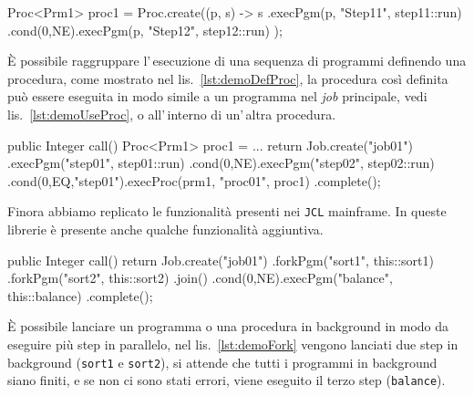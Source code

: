 \begin{elisting}[!htb]
\begin{javacode}
    Proc<Prm1> proc1 = Proc.create((p, s) -> s
        .execPgm(p, "Step11", step11::run)
        .cond(0,NE).execPgm(p, "Step12", step12::run)
    );
\end{javacode}
\caption{Esempio di definizione di una procedura con una classe parametro}
\label{lst:demoDefProc}
\end{elisting}
È possibile raggruppare l'\,esecuzione di una sequenza di programmi definendo
una procedura, come mostrato nel lis.~\ref{lst:demoDefProc}, la procedura così
definita può essere eseguita in modo simile a un programma nel \textit{job}
principale, vedi lis.~\ref{lst:demoUseProc}, o all'\,interno di un'\,altra
procedura.
\begin{elisting}[!htb]
\begin{javacode}
public Integer call() {
    Proc<Prm1> proc1 = ...
    return Job.create("job01")
        .execPgm("step01", step01::run)
        .cond(0,NE).execPgm("step02", step02::run)
        .cond(0,EQ,"step01").execProc(prm1, "proc01", proc1)
        .complete();
}
\end{javacode}
\caption{Esempio uso di una procedura nel job}
\label{lst:demoUseProc}
\end{elisting}

Finora abbiamo replicato le funzionalità presenti nei \texttt{JCL} mainframe.
In queste librerie è presente anche qualche funzionalità aggiuntiva.

\begin{elisting}[!htb]
\begin{javacode}
public Integer call() {
    return Job.create("job01")
        .forkPgm("sort1", this::sort1)
        .forkPgm("sort2", this::sort2)
        .join()
        .cond(0,NE).execPgm("balance", this::balance)
        .complete();
}
\end{javacode}
\caption{Esempio uso di una procedura nel job}
\label{lst:demoFork}
\end{elisting}
È possibile lanciare un programma o una procedura in background in modo da
eseguire più step in parallelo, nel lis.~\ref{lst:demoFork} vengono lanciati due
step in background (\texttt{sort1} e \texttt{sort2}), si attende che tutti i
programmi in background siano finiti, e se non ci sono stati errori, viene
eseguito il terzo step (\texttt{balance}).


